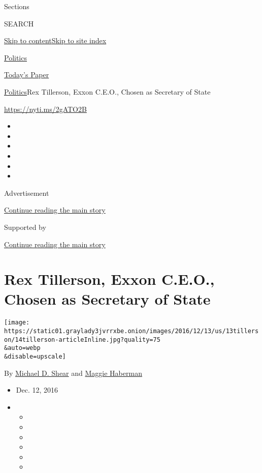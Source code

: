Sections

SEARCH

\protect\hyperlink{site-content}{Skip to
content}\protect\hyperlink{site-index}{Skip to site index}

\href{https://www.nytimes3xbfgragh.onion/section/politics}{Politics}

\href{https://myaccount.nytimes3xbfgragh.onion/auth/login?response_type=cookie\&client_id=vi}{}

\href{https://www.nytimes3xbfgragh.onion/section/todayspaper}{Today's
Paper}

\href{/section/politics}{Politics}\textbar{}Rex Tillerson, Exxon C.E.O.,
Chosen as Secretary of State

\url{https://nyti.ms/2gATO2B}

\begin{itemize}
\item
\item
\item
\item
\item
\item
\end{itemize}

Advertisement

\protect\hyperlink{after-top}{Continue reading the main story}

Supported by

\protect\hyperlink{after-sponsor}{Continue reading the main story}

\hypertarget{rex-tillerson-exxon-ceo-chosen-as-secretary-of-state}{%
\section{Rex Tillerson, Exxon C.E.O., Chosen as Secretary of
State}\label{rex-tillerson-exxon-ceo-chosen-as-secretary-of-state}}

\texttt{[image: https://static01.graylady3jvrrxbe.onion/images/2016/12/13/us/13tillerson/14tillerson-articleInline.jpg?quality=75\\\&auto=webp\\\&disable=upscale]}

By \href{http://www.nytimes3xbfgragh.onion/by/michael-d-shear}{Michael
D. Shear} and
\href{http://www.nytimes3xbfgragh.onion/by/maggie-haberman}{Maggie
Haberman}

\begin{itemize}
\item
  Dec. 12, 2016
\item
  \begin{itemize}
  \item
  \item
  \item
  \item
  \item
  \item
  \end{itemize}
\end{itemize}

